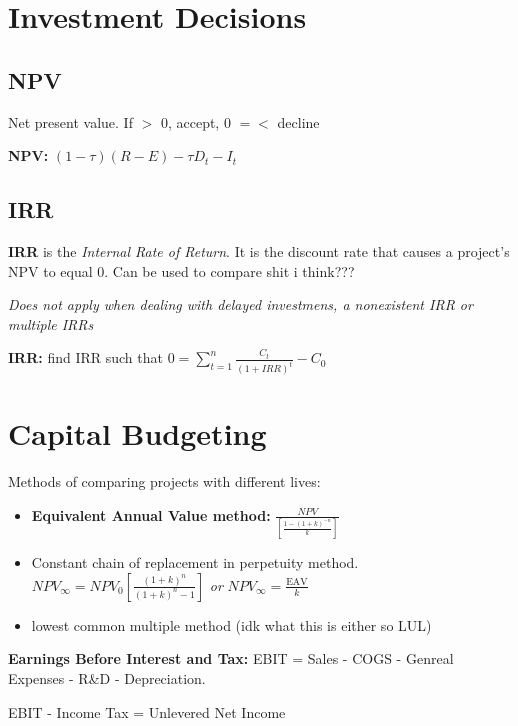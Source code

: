 \documentclass{report}
\begin{document}
\section{Investment Decisions}
\label{sec:invdec}


\subsection{NPV}
\label{subsec:npv}
Net present value. If $>$ 0, accept, 0 $=<$ decline

\vspace*{1\baselineskip}

\textbf{NPV:} $(1-\tau)(R-E)-\tau D_t-I_t$

\subsection{IRR}
\label{sec:irr}

\textbf{IRR} is the \textit{Internal Rate of Return}. It is the discount rate that causes a project's NPV to equal 0. Can be used to compare shit i think???

\textit{Does not apply when dealing with delayed investmens, a nonexistent IRR or multiple IRRs}

\vspace*{1\baselineskip}
\textbf{IRR:} find IRR such that $0=\sum_{t=1}^n\frac{C_t}{(1+IRR)^t}-C_0$
\newpage
\section{Capital Budgeting}
\label{sec:capital-budgeting}

Methods of comparing projects with different lives:
\begin{itemize}
\item \textbf{Equivalent Annual Value method:} $\frac{NPV}{[\frac{1-(1+k)^{-n}}{k}]}$
\item Constant chain of replacement in perpetuity method. $NPV_{\infty}=NPV_0[\frac{(1+k)^n}{(1+k)^n-1}]$
  \textit{or}
  $NPV_{\infty}=\frac{\mbox{EAV}}{k}$

 
\item lowest common multiple method (idk what this is either so LUL)
\end{itemize}

\textbf{Earnings Before Interest and Tax:} EBIT = Sales - COGS - Genreal Expenses - R\&D - Depreciation.

EBIT - Income Tax = Unlevered Net Income
\end{document}

